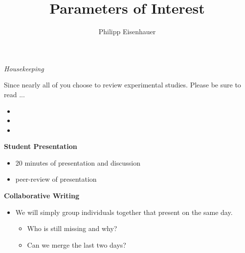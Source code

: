 

\title{Parameters of Interest}
\author{Philipp Eisenhauer}

\date{}

\let\otp\titlepage


\maketitle

\begin{frame}\begin{center}
\LARGE\textit{Housekeeping}
\end{center}\end{frame}
\begin{frame}
Since nearly all of you choose to review experimental studies. Please be sure to read ...

\begin{itemize}
\item {}
\item {}
\item {}
\end{itemize}
\end{frame}

\begin{frame}
\textbf{Student Presentation}
\begin{itemize}
\item 20 minutes of presentation and discussion
\item peer-review of presentation\vspace{0.5cm}
\end{itemize}

\textbf{Collaborative Writing}
\begin{itemize}
\item We will simply group individuals together that present on the same day.
\begin{itemize}
\item Who is still missing and why?
\item Can we merge the last two days?
\end{itemize}
\end{itemize}
\end{frame}


